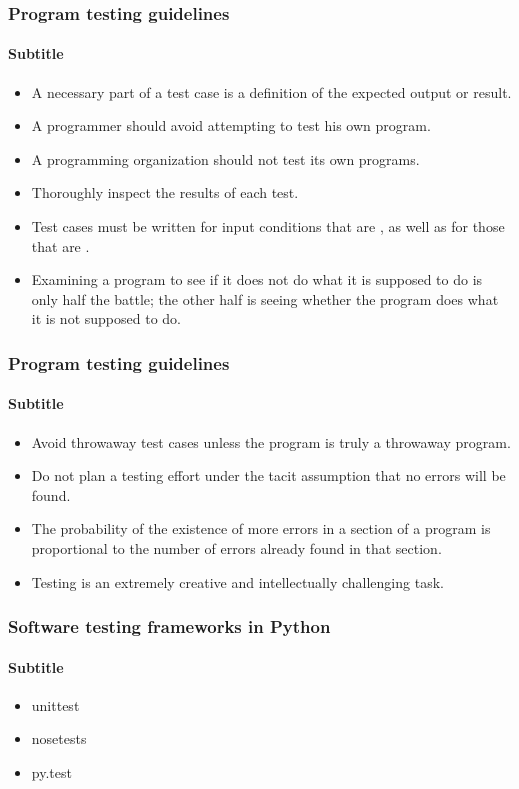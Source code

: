 \documentclass{beamer}
\begin{document}
\begin{frame}[fragile]
    \frametitle{Program testing guidelines}
    \framesubtitle{Subtitle}

    \begin{itemize}
        \item A necessary part of a test case is a definition of the expected
        output or result.
        \item A programmer should avoid attempting to test his own program.
        \item A programming organization should not test its own programs.
        \item Thoroughly inspect the results of each test.
        \item Test cases must be written for input conditions that are
            , as well as for those that are
            .
        \item Examining a program to see if it does not do what it is supposed
        to do is only half the battle; the other half is seeing whether
        the program does what it is not supposed to do.
    \end{itemize}
\end{frame}

\begin{frame}[fragile]
    \frametitle{Program testing guidelines}
    \framesubtitle{Subtitle}

    \begin{itemize}
        \item Avoid throwaway test cases unless the program is truly a
        throwaway program.
        \item Do not plan a testing effort under the tacit assumption that no
        errors will be found.
        \item The probability of the existence of more errors in a section of a
        program is proportional to the number of errors already found in
        that section.
        \item Testing is an extremely creative and intellectually challenging
        task.
    \end{itemize}
\end{frame}

\begin{frame}[fragile]
    \frametitle{Software testing frameworks in Python}
    \framesubtitle{Subtitle}

    \begin{itemize}
        \item unittest
        \item nosetests
        \item py.test
    \end{itemize}
\end{frame}
\end{document}
